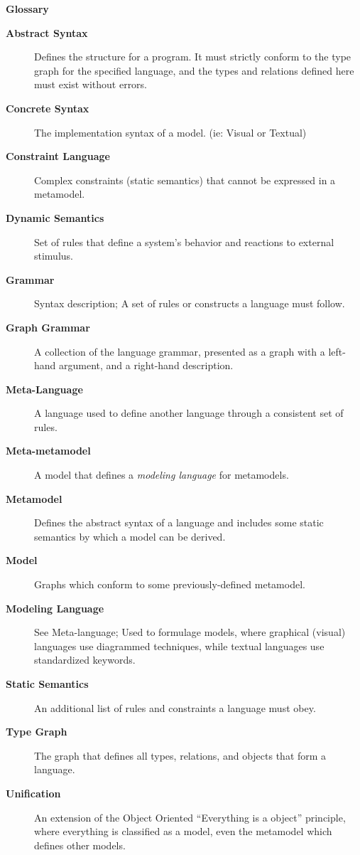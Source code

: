 \newpage
{}
{}

\vspace{1cm}
{\Huge \bf Glossary}
\vspace{1cm}

\begin{description}

\item[\bf Abstract Syntax] 
Defines the structure for a program. It must strictly conform to the type graph for the specified language, and the types and relations defined here must exist
without errors.

\item[\bf Concrete Syntax]
The implementation syntax of a model. (ie: Visual or Textual)

\item[\bf Constraint Language] 
Complex constraints (static semantics) that cannot be expressed in a metamodel.

\item[\bf Dynamic Semantics] 
Set of rules that define a system's behavior and reactions to external stimulus.

\item[\bf Grammar] 
Syntax description; A set of rules or constructs a language must follow.

\item[\bf Graph Grammar] 
A collection of the language grammar, presented as a graph with a left-hand argument, and a right-hand description.

\item[\bf Meta-Language] 
A language used to define another language through a consistent set of rules. 

\item[\bf Meta-metamodel] 
A model that defines a \emph{modeling language} for metamodels.

\item[\bf Metamodel] 
Defines the abstract syntax of a language and includes some static semantics by which a model can be derived.

\item[\bf Model] 
Graphs which conform to some previously-defined metamodel.

\item[\bf Modeling Language] 
See Meta-language; Used to formulage models, where graphical (visual) languages use diagrammed techniques, while textual languages use standardized keywords.

\item[\bf Static Semantics] 
An additional list of rules and constraints a language must obey.

\item[\bf Type Graph] 
The graph that defines all types, relations, and objects that form a language.

\item[\bf Unification]  
An extension of the Object Oriented ``Everything is a object'' principle, where everything is classified as a model, even the metamodel which defines other models.


\end{description}